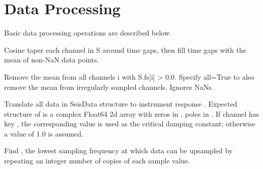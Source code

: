 \documentclass[letterpaper,11pt,english]{sphinxmanual}
\begin{document}
\section{Data Processing}
\label{\detokenize{src/Processing/processing:data-processing}}\label{\detokenize{src/Processing/processing::doc}}
Basic data processing operations are described below.


\begin{fulllineitems}
\end{fulllineitems}


Cosine taper each channel in S around time gaps, then fill time gaps with the mean of non-NaN data points.

Remove the mean from all channels i with S.fs{[}i{]} \textgreater{} 0.0. Specify all=True to also remove the mean from irregularly sampled channels. Ignores NaNs.


\begin{fulllineitems}
\end{fulllineitems}


Translate all data in SeisData structure  to instrument response . Expected structure of  is a complex Float64 2d array with zeros in , poles in . If channel  has key , the corresponding value is used as the critical damping constant; otherwise a value of 1.0 is assumed.

\begin{fulllineitems}
\label{\detokenize{src/Processing/processing:lcfs}}
\end{fulllineitems}


Find , the lowest sampling frequency at which data can be upsampled by repeating an integer number of copies of each sample value.


\begin{fulllineitems}
\end{fulllineitems}
\end{document}
